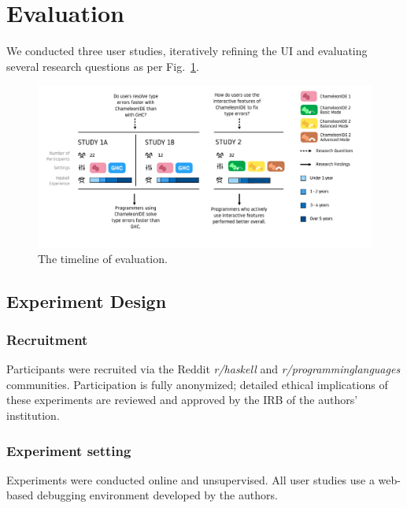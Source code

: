 \section{Evaluation}

We conducted three user studies, iteratively refining the \chameleon{} UI and evaluating several research questions as per Fig.~\ref{fig:timeline}. 


\begin{figure}
    \centering
    \includegraphics[width=\columnwidth,trim=30mm 35mm 35mm 5mm]{images/timeline.pdf}
    \caption{The timeline of \chameleon{}  evaluation.}
    \label{fig:timeline}
\end{figure}

\subsection{Experiment Design}
\subsubsection*{\textbf{Recruitment}}

Participants were recruited via the Reddit \textit{r/haskell} and \textit{r/programminglanguages} communities. 
Participation is fully anonymized; detailed ethical implications of these experiments are reviewed and approved by the IRB of the authors' institution.


\subsubsection*{\textbf{Experiment setting}}
Experiments were conducted online and unsupervised. 
All user studies use a web-based debugging environment developed by the authors. 


